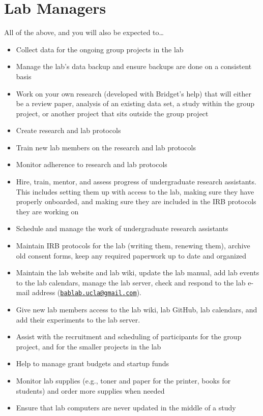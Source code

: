 \documentclass[]{book}
\providecommand{\tightlist}{%
  \setlength{\itemsep}{0pt}\setlength{\parskip}{0pt}}
\begin{document}
\hypertarget{lab-managers}{%
\section{Lab Managers}\label{lab-managers}}

All of the above, and you will also be expected to\ldots{}

\begin{itemize}
\tightlist
\item
  Collect data for the ongoing group projects in the lab
\item
  Manage the lab's data backup and ensure backups are done on a consistent basis
\item
  Work on your own research (developed with Bridget's help) that will either be a review paper, analysis of an existing data set, a study within the group project, or another project that sits outside the group project
\item
  Create research and lab protocols
\item
  Train new lab members on the research and lab protocols
\item
  Monitor adherence to research and lab protocols
\item
  Hire, train, mentor, and assess progress of undergraduate research assistants. This includes setting them up with access to the lab, making sure they have properly onboarded, and making sure they are included in the IRB protocols they are working on
\item
  Schedule and manage the work of undergraduate research assistants
\item
  Maintain IRB protocols for the lab (writing them, renewing them), archive old consent forms, keep any required paperwork up to date and organized
\item
  Maintain the lab website and lab wiki, update the lab manual, add lab events to the lab calendars, manage the lab server, check and respond to the lab e-mail address (\href{mailto:bablab.ucla@gmail.com}{\nolinkurl{bablab.ucla@gmail.com}}).
\item
  Give new lab members access to the lab wiki, lab GitHub, lab calendars, and add their experiments to the lab server.
\item
  Assist with the recruitment and scheduling of participants for the group project, and for the smaller projects in the lab
\item
  Help to manage grant budgets and startup funds
\item
  Monitor lab supplies (e.g., toner and paper for the printer, books for students) and order more supplies when needed
\item
  Ensure that lab computers are never updated in the middle of a study
\end{itemize}
\end{document}
